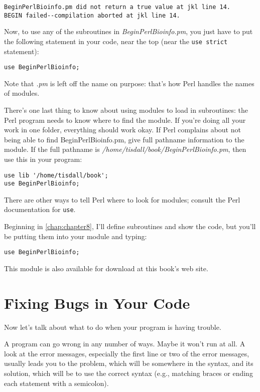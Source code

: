 \begin{lstlisting}
BeginPerlBioinfo.pm did not return a true value at jkl line 14.
BEGIN failed--compilation aborted at jkl line 14.
\end{lstlisting}

Now, to use any of the subroutines in \textit{BeginPerlBioinfo.pm}, you just have to put the following statement in your code, near the top (near the \verb|use strict| statement): 

\begin{lstlisting}
use BeginPerlBioinfo;
\end{lstlisting}

Note that \textit{.pm} is left off the name on purpose: that's how Perl handles the names of modules.

There's one last thing to know about using modules to load in subroutines: the Perl program needs to know where to find the module. If you're doing all your work in one folder, everything should work okay.  If Perl complains about not being able to find BeginPerlBioinfo.pm, give full pathname information to the module. If the full pathname is \textit{/home/tisdall/book/BeginPerlBioinfo.pm}, then use this in your program:

\begin{lstlisting}
use lib '/home/tisdall/book';
use BeginPerlBioinfo;
\end{lstlisting}

There are other ways to tell Perl where to look for modules; consult the Perl documentation for \verb|use|.

Beginning in \autoref{chap:chapter8}, I'll define subroutines and show the code, but you'll be putting them into your module and typing:

\begin{lstlisting}
use BeginPerlBioinfo;
\end{lstlisting}

This module is also available for download at this book's web site. 

\section{Fixing Bugs in Your Code}
Now let's talk about what to do when your program is having trouble.

A program can go wrong in any number of ways. Maybe it won't run at all.  A look at the error messages, especially the first line or two of the error messages, usually leads you to the problem, which will be somewhere in the syntax, and its solution, which will be to use the correct syntax (e.g., matching braces or ending each statement with a semicolon).

